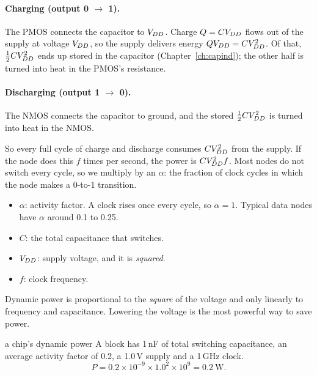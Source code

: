 \paragraph{Charging (output 0 $\to$ 1).} The PMOS connects the capacitor to $V_{DD}$. Charge $Q = CV_{DD}$ flows out of the supply at voltage $V_{DD}$, so the supply delivers energy $QV_{DD} = CV_{DD}^2$. Of that, $\tfrac12 CV_{DD}^2$ ends up stored in the capacitor (Chapter~\ref{ch:capind}); the other half is turned into heat in the PMOS's resistance.

\paragraph{Discharging (output 1 $\to$ 0).} The NMOS connects the capacitor to ground, and the stored $\tfrac12 CV_{DD}^2$ is turned into heat in the NMOS.

So every full cycle of charge and discharge consumes $CV_{DD}^2$ from the supply. If the node does this $f$ times per second, the power is $CV_{DD}^2 f$. Most nodes do not switch every cycle, so we multiply by an  $\alpha$: the fraction of clock cycles in which the node makes a 0-to-1 transition.

\begin{center}
\end{center}

\begin{itemize}
  \item $\alpha$: activity factor. A clock rises once every cycle, so $\alpha = 1$. Typical data nodes have $\alpha$ around 0.1 to 0.25.
  \item $C$: the total capacitance that switches.
  \item $V_{DD}$: supply voltage, and it is \emph{squared}.
  \item $f$: clock frequency.
\end{itemize}

\begin{bigidea}
Dynamic power is proportional to the \emph{square} of the voltage and only linearly to frequency and capacitance. Lowering the voltage is the most powerful way to save power.
\end{bigidea}

\begin{worked}{a chip's dynamic power}
A block has 1\,nF of total switching capacitance, an average activity factor of 0.2, a 1.0\,V supply and a 1\,GHz clock.
\[
  P = 0.2 \times 10^{-9} \times 1.0^2 \times 10^9 = 0.2~\text{W}.
\]
\end{worked}

